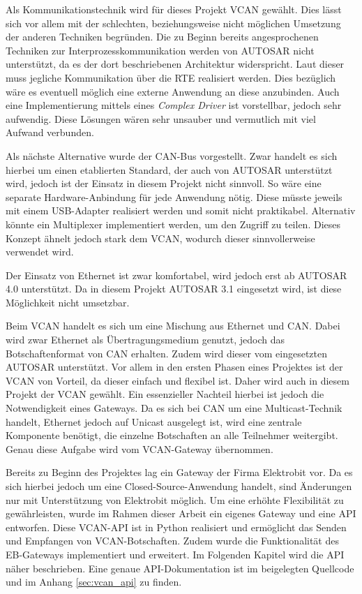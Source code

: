 \documentclass[
  a4paper,					    %
  twoside,
  DIV=calc,     				%
  bibliography=totoc,
  cleardoublepage=empty,
  ngerman,     					%
  final       					%
]{scrbook}
\begin{document}
Als Kommunikationstechnik wird für dieses Projekt VCAN gewählt. Dies lässt sich vor allem mit der schlechten, beziehungsweise nicht möglichen Umsetzung der anderen Techniken begründen. Die zu Beginn bereits angesprochenen Techniken zur Interprozesskommunikation werden von AUTOSAR nicht unterstützt, da es der dort beschriebenen Architektur widerspricht. Laut dieser muss jegliche Kommunikation über die RTE realisiert werden. Dies bezüglich wäre es eventuell möglich eine externe Anwendung an diese anzubinden. Auch eine Implementierung mittels eines \emph{Complex Driver} ist vorstellbar, jedoch sehr aufwendig. Diese Lösungen wären sehr unsauber und vermutlich mit viel Aufwand verbunden.

Als nächste Alternative wurde der CAN-Bus vorgestellt. Zwar handelt es sich hierbei um einen etablierten Standard, der auch von AUTOSAR unterstützt wird, jedoch ist der Einsatz in diesem Projekt nicht sinnvoll. So wäre eine separate Hardware-Anbindung für jede Anwendung nötig. Diese müsste jeweils mit einem USB-Adapter realisiert werden und somit nicht praktikabel. Alternativ könnte ein Multiplexer implementiert werden, um den Zugriff zu teilen. Dieses Konzept ähnelt jedoch stark dem VCAN, wodurch dieser sinnvollerweise verwendet wird.

Der Einsatz von Ethernet ist zwar komfortabel, wird jedoch erst ab AUTOSAR 4.0 unterstützt. Da in diesem Projekt AUTOSAR 3.1 eingesetzt wird, ist diese Möglichkeit nicht umsetzbar.

Beim VCAN handelt es sich um eine Mischung aus Ethernet und CAN. Dabei wird zwar Ethernet als Übertragungsmedium genutzt, jedoch das Botschaftenformat von CAN erhalten. Zudem wird dieser vom eingesetzten AUTOSAR unterstützt. Vor allem in den ersten Phasen eines Projektes ist der VCAN von Vorteil, da dieser einfach und flexibel ist. Daher wird auch in diesem Projekt der VCAN gewählt. Ein essenzieller Nachteil hierbei ist jedoch die Notwendigkeit eines Gateways. Da es sich bei CAN um eine Multicast-Technik handelt, Ethernet jedoch auf Unicast ausgelegt ist, wird eine zentrale Komponente benötigt, die einzelne Botschaften an alle Teilnehmer weitergibt. Genau diese Aufgabe wird vom VCAN-Gateway übernommen. 

Bereits zu Beginn des Projektes lag ein Gateway der Firma Elektrobit vor. Da es sich hierbei jedoch um eine Closed-Source-Anwendung handelt, sind Änderungen nur mit Unterstützung von Elektrobit möglich. Um eine erhöhte Flexibilität zu gewährleisten, wurde im Rahmen dieser Arbeit ein eigenes Gateway und eine API entworfen. Diese VCAN-API ist in Python realisiert und ermöglicht das Senden und Empfangen von VCAN-Botschaften. Zudem wurde die Funktionalität des EB-Gateways implementiert und erweitert. Im Folgenden Kapitel wird die API näher beschrieben. Eine genaue API-Dokumentation ist im beigelegten Quellcode und im Anhang \ref{sec:vcan_api} zu finden.
\end{document}
